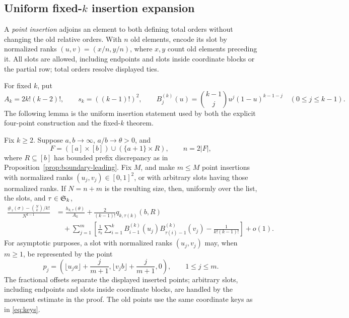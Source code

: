 \subsection{Uniform fixed-\texorpdfstring{$k$}{k} insertion expansion}
A \emph{point insertion} adjoins an element to both defining total orders
without changing the old relative orders.  With $n$ old elements, encode its
slot by normalized ranks $(u,v)=(x/n,y/n)$, where $x,y$ count old elements
preceding it.  All slots are allowed, including endpoints and slots inside
coordinate blocks or the partial row; total orders resolve displayed ties.

For fixed $k$, put
\[
 A_k=2k!(k-2)!,\qquad s_k=((k-1)!)^2,
 \qquad B^{(k)}_j(u)=\binom{k-1}{j}u^j(1-u)^{k-1-j}
 \quad(0\leq j\leq k-1).
\]
The following lemma is the uniform insertion statement used by both the
explicit four-point construction and the fixed-$k$ theorem.

\begin{lemma}\label{lem:finite-padding}
Fix $k\ge2$.  Suppose $a,b\to\infty$, $a/b\to\theta>0$, and
\[
 F=([a]\times[b])\cup(\{a+1\}\times R),
 \qquad n=2|F|,
\]
where $R\subseteq[b]$ has bounded prefix discrepancy as in
Proposition~\ref{prop:boundary-leading}.  Fix $M$, and make $m\le M$ point
insertions with normalized ranks $(u_j,v_j)\in[0,1]^2$, or with arbitrary
slots having those normalized ranks.  If $N=n+m$ is the resulting size,
then, uniformly over the list, the slots, and $\tau\in\mathfrak S_k$,
\begin{equation}\label{eq:insertion-leading}
\begin{aligned}
 \frac{\#_\tau(\sigma)-\binom Nk/k!}{N^{k-1}}
 &=\frac{h_{k,\tau}(\theta)}{A_k}
  +\frac{2}{(k-1)!}q_{k,\tau(k)}(b,R)\\[-2pt]
 &\quad+\sum_{j=1}^m\left[
    \frac1{s_k}\sum_{i=1}^k
      B^{(k)}_{i-1}(u_j)B^{(k)}_{\tau(i)-1}(v_j)
    -\frac1{k!(k-1)!}\right]+o(1).
\end{aligned}
\end{equation}
For asymptotic purposes, a slot with normalized ranks $(u_j,v_j)$ may,
when $m\ge1$, be represented by the point
\begin{equation}\label{eq:inserted-points}
 p_j=\left(\lfloor u_ja\rfloor+\frac{j}{m+1},
            \lfloor v_jb\rfloor+\frac{j}{m+1},0\right),
 \qquad 1\le j\le m.
\end{equation}
The fractional offsets separate the displayed inserted points; arbitrary
slots, including endpoints and slots inside coordinate blocks, are handled
by the movement estimate in the proof.  The old points use the same
coordinate keys as in \eqref{eq:keys}.
\end{lemma}

